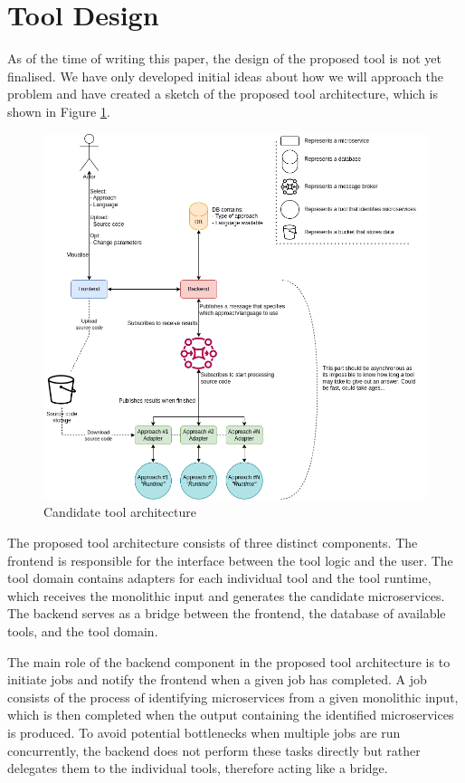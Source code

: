 \documentclass[conference]{IEEEtran}
\begin{document}
\section{Tool Design}

As of the time of writing this paper, the design of the proposed tool is not
yet finalised. We have only developed initial ideas about how we will approach
the problem and have created a sketch of the proposed tool architecture, which
is shown in Figure \ref{fig:tool-architecture}.

\begin{figure}[!htb]
  \caption{Candidate tool architecture}
  \label{fig:tool-architecture}
  \centering
  \includegraphics[width=\textwidth]{thesis-architecture.drawio}
\end{figure}

The proposed tool architecture consists of three distinct components. The
frontend is responsible for the interface between the tool logic and the user.
The tool domain contains adapters for each individual tool and the tool runtime,
which receives the monolithic input and generates the candidate microservices.
The backend serves as a bridge between the frontend, the database of available
tools, and the tool domain.

The main role of the backend component in the proposed tool architecture is to
initiate jobs and notify the frontend when a given job has completed. A job
consists of the process of identifying microservices from a given monolithic
input, which is then completed when the output containing the identified
microservices is produced. To avoid potential bottlenecks when multiple jobs
are run concurrently, the backend does not perform these tasks directly but
rather delegates them to the individual tools, therefore acting like a bridge.
\end{document}
